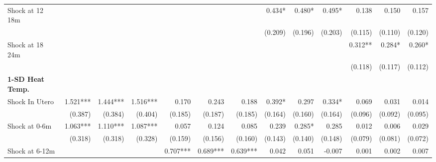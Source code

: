 \begin{tabular}{lrrrrrrrrrrrr}
Shock at 12 18m                             &              &              &              &              &              &              &       0.434* &       0.480* &        0.495* &        0.138 &        0.150 &         0.157 \\ 
                                            &              &              &              &              &              &              &      (0.209) &      (0.196) &       (0.203) &      (0.115) &      (0.110) &       (0.120) \\ 
Shock at 18 24m                             &              &              &              &              &              &              &              &              &               &      0.312** &       0.284* &        0.260* \\ 
                                            &              &              &              &              &              &              &              &              &               &      (0.118) &      (0.117) &       (0.112) \\ 
\textbf{1-SD Heat Temp.}                    &              &              &              &              &              &              &              &              &               &              &              &               \\ 
Shock In Utero                              &     1.521*** &     1.444*** &     1.516*** &        0.170 &        0.243 &        0.188 &       0.392* &        0.297 &        0.334* &        0.069 &        0.031 &         0.014 \\ 
                                            &      (0.387) &      (0.384) &      (0.404) &      (0.185) &      (0.187) &      (0.185) &      (0.164) &      (0.160) &       (0.164) &      (0.096) &      (0.092) &       (0.095) \\ 
Shock at 0-6m                               &     1.063*** &     1.110*** &     1.087*** &        0.057 &        0.124 &        0.085 &        0.239 &       0.285* &         0.285 &        0.012 &        0.006 &         0.029 \\ 
                                            &      (0.318) &      (0.318) &      (0.328) &      (0.159) &      (0.156) &      (0.160) &      (0.143) &      (0.140) &       (0.148) &      (0.079) &      (0.081) &       (0.072) \\ 
Shock at 6-12m                              &              &              &              &     0.707*** &     0.689*** &     0.639*** &        0.042 &        0.051 &        -0.007 &        0.001 &        0.002 &         0.007 \\ 

\end{tabular}
